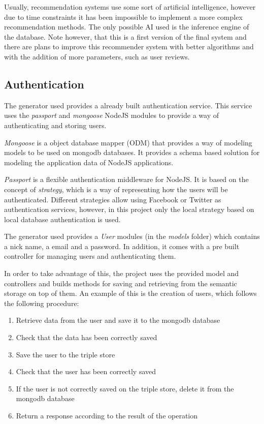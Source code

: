 Usually, recommendation systems use some sort of artificial intelligence, however due to time constraints it has been impossible to implement a more complex recommendation methods. The only possible AI used is the inference engine of the database. Note however, that this is a first version of the final system and there are plans to improve this recommender system with better algorithms and with the addition of more parameters, such as user reviews.

\subsection{Authentication}

The generator used provides a already built authentication service. This service uses the \textit{passport} and \textit{mongoose} NodeJS modules to provide a way of authenticating and storing users.

\textit{Mongoose} is a object database mapper (ODM) that provides a way of modeling models to be used on mongodb databases. It provides a schema based solution for modeling the application data of NodeJS applications.

\textit{Passport} is a flexible authentication middleware for NodeJS. It is based on the concept of \textit{strategy}, which is a way of representing how the users will be authenticated. Different strategies allow using Facebook or Twitter as authentication services, however, in this project only the local strategy based on local database authentication is used.

The generator used provides a \textit{User} modules (in the \textit{models} folder) which contains a nick name, a email and a password. In addition, it comes with a pre built controller for managing users and authenticating them.

In order to take advantage of this, the project uses the provided model and controllers and builds methods for saving and retrieving from the semantic storage on top of them. An example of this is the creation of users, which follows the following procedure:

\begin{enumerate}
\item Retrieve data from the user and save it to the mongodb database
\item Check that the data has been correctly saved
\item Save the user to the triple store
\item Check that the user has been correctly saved
\item If the user is not correctly saved on the triple store, delete it from the mongodb database
\item Return a response according to the result of the operation
\end{enumerate}

